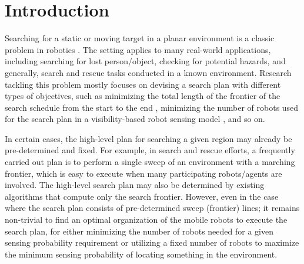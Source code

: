 \section{Introduction}

Searching for a static or moving target in a planar environment is a classic 
problem in robotics \cite{guibas1999visibility, suzuki1992searching, lavalle2000algorithm, stiffler2017persistent, kolling2007graph}. 
%
The setting applies to many real-world applications, including searching for
lost person/object, checking for potential hazards, and generally, search and rescue tasks conducted in a known environment. 
%
Research tackling this problem mostly focuses on devising a search plan with
different types of objectives, such as minimizing the total length of the
frontier of the search schedule from the start to the end 
\cite{kolling2017coordinated}, minimizing the number of robots used for 
the search plan in a visibility-based robot sensing model
\cite{megiddo1988complexity}, and so on.

In certain cases, the high-level plan for searching a given region may already be pre-determined and fixed. For example, in search and rescue efforts, a frequently carried out plan is to perform a single sweep of an environment with a marching frontier, which is easy to execute when many participating robots/agents are involved.
%
The high-level search plan may also be determined by existing algorithms that 
compute only the search frontier.
%
However, even in the case where the search plan consists of pre-determined 
sweep (frontier) lines; it remains non-trivial to find an optimal organization 
of the mobile robots to execute the search plan, for either minimizing the 
number of robots needed for a given sensing probability requirement or utilizing 
a fixed number of robots to maximize the minimum sensing probability of locating something in the environment. 

